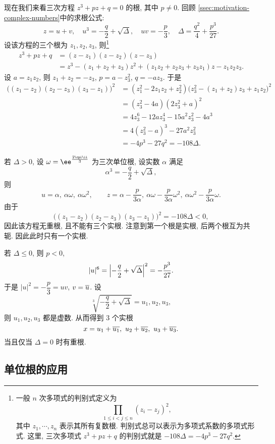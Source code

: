 现在我们来看三次方程 $z^3+pz+q=0$ 的根, 其中 $p\neq 0$.
回顾 \ref{ssec:motivation-complex-numbers}中的求根公式:
\[
  z=u+v,\quad 
  u^3=-\frac q2+\sqrt{\Delta},\quad 
  uv=-\frac p3,\quad 
  \Delta=\frac{q^2}4+\frac{p^3}{27}.
\]
设该方程的三个根为 $z_1,z_2,z_3$, 则\footnote{%
  一般 $n$ 次多项式的判别式定义为
  \[
    \prod_{1\le i<j\le n}(z_i-z_j)^2,
  \]
  其中 $z_1,\cdots,z_n$ 表示其所有复数根.
  判别式总可以表示为多项式系数的多项式形式.
  这里, 三次多项式 $z^3+pz+q$ 的判别式就是 $-108\Delta=-4p^3-27q^2$.
}
\begin{align*}
   z^3+pz+q&
  =(z-z_1)(z-z_2)(z-z_3)\\&
  =z^3-(z_1+z_2+z_3)z^2+(z_1z_2+z_2z_3+z_3z_1)z-z_1z_2z_3.
\end{align*}
设 $a=z_1z_2$, 则 $z_1+z_2=-z_3$, $p=a-z_3^2$, $q=-az_3$.
于是
\begin{align*}
   \bigl((z_1-z_2)(z_2-z_3)(z_3-z_1)\bigr)^2&
  =(z_1^2-2z_1z_2+z_2^2)\bigl(z_3^2-(z_1+z_2)z_3+z_1z_2\bigr)^2\\&
  =(z_3^2-4a)(2z_3^2+a)^2\\&
  =4z_3^6-12az_3^4-15a^2z_3^2-4a^3\\&
  =4(z_3^2-a)^3-27a^2z_3^2\\&
  =-4p^3-27q^2
  =-108\Delta.
\end{align*}

\begin{enuma}
  \item 若 $\Delta>0$, 设 $\omega=\ee^{\frac{2\cpi \ii}3}$ 为三次单位根, 设实数 $\alpha$ 满足
  \[\alpha^3=-\frac q2+\sqrt{\Delta},\]
  则
  \[
    u=\alpha,\ \alpha\omega,\ \alpha\omega^2,\qquad
    z=\alpha-\frac p{3\alpha},\ 
      \alpha\omega-\frac p{3\alpha} \omega^2,\ 
      \alpha\omega^2-\frac p{3\alpha} \omega.
  \]
  由于
  \[
      \bigl((z_1-z_2)(z_2-z_3)(z_3-z_1)\bigr)^2
    =-108\Delta<0,
  \]
  因此该方程无重根, 且不能有三个实根.
  注意到第一个根是实根, 后两个根互为共轭.
  因此此时只有一个实根.
  \item 若 $\Delta\le 0$, 则 $p<0$,
  \[
    |u|^6=\left|-\frac q2+\sqrt\Delta\right|^2=-\frac{p^3}{27}.
  \]
  于是 $|u|^2=-\dfrac p3=uv$, $v=\overline u$.
  设
  \[
    \sqrt[3]{-\frac q2+\sqrt{\Delta}}=u_1,u_2,u_3,
  \]
  则 $u_1,u_2,u_3$ 都是虚数. 从而得到 $3$ 个实根
  \[
    x=u_1+\ov{u_1},\ u_2+\ov{u_2},\ u_3+\ov{u_3}.
  \]
  当且仅当 $\Delta=0$ 时有重根.
\end{enuma}


\subsection{单位根的应用\optional}

